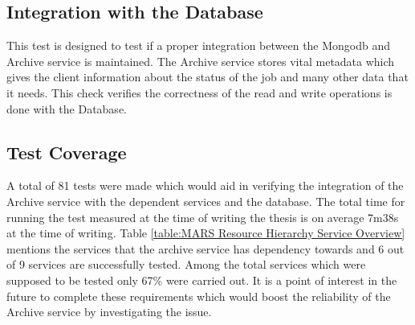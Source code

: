 \subsection{Integration with the Database}
This test is designed to test if a proper integration between the Mongodb and Archive service is maintained. The Archive service stores vital metadata
which gives the client information about the status of the job and many other data that it needs. This check verifies the correctness of the read and write 
operations is done with the Database. 

\subsection{Test Coverage}
A total of 81 tests were made which would aid in verifying the integration of the Archive service with the dependent services and the database. The 
total time for running the test measured at the time of writing the thesis is on average 7m38s at the time of writing. Table \ref{table:MARS Resource Hierarchy Service Overview}
mentions the services that the archive service has dependency towards and 6 out of 9 services are successfully tested. Among the total services 
which were supposed to be tested only 67\%  were carried out. It is a point of interest in the future to complete these requirements which would boost the
reliability of the Archive service by investigating the issue. 
